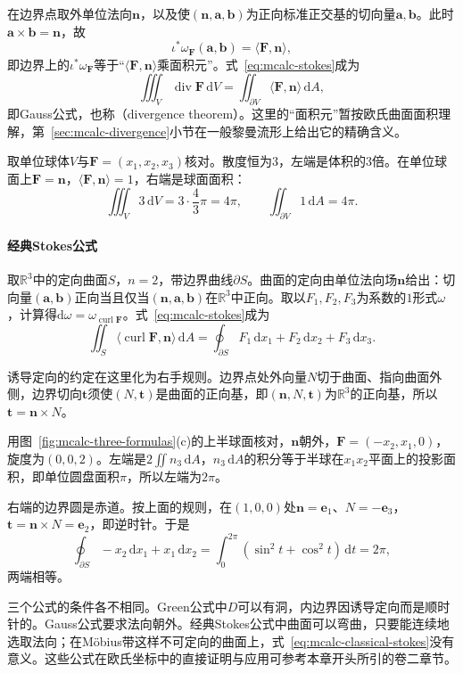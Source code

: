 在边界点取外单位法向$\bm n$，以及使$(\bm n,\bm a,\bm b)$为正向标准正交基的切向量$\bm a,\bm b$。此时$\bm a\times\bm b=\bm n$，故
\[
\iota^*\omega_{\bm F}(\bm a,\bm b)=\langle\bm F,\bm n\rangle ,
\]
即边界上的$\iota^*\omega_{\bm F}$等于“$\langle\bm F,\bm n\rangle$乘面积元”。式~\eqref{eq:mcalc-stokes}成为
\begin{equation}
\iiint_V\operatorname{div}\bm F\,\mathrm dV=\iint_{\partial V}\langle\bm F,\bm n\rangle\,\mathrm dA ,
\label{eq:mcalc-gauss}
\end{equation}
即Gauss公式，也称（divergence theorem）。这里的“面积元”暂按欧氏曲面面积理解，第~\ref{sec:mcalc-divergence}小节在一般黎曼流形上给出它的精确含义。

取单位球体$V$与$\bm F=(x_1,x_2,x_3)$核对。散度恒为$3$，左端是体积的$3$倍。在单位球面上$\bm F=\bm n$，$\langle\bm F,\bm n\rangle=1$，右端是球面面积：
\[
\iiint_V3\,\mathrm dV=3\cdot\frac43\pi=4\pi,\qquad
\iint_{\partial V}1\,\mathrm dA=4\pi .
\]

\paragraph{经典Stokes公式}
取$\mathbb R^3$中的定向曲面$S$，$n=2$，带边界曲线$\partial S$。曲面的定向由单位法向场$\bm n$给出：切向量$(\bm a,\bm b)$正向当且仅当$(\bm n,\bm a,\bm b)$在$\mathbb R^3$中正向。取以$F_1,F_2,F_3$为系数的$1$形式$\omega$，计算得$\mathrm d\omega=\omega_{\operatorname{curl}\bm F}$。式~\eqref{eq:mcalc-stokes}成为
\begin{equation}
\iint_S\langle\operatorname{curl}\bm F,\bm n\rangle\,\mathrm dA=\oint_{\partial S}F_1\,\mathrm dx_1+F_2\,\mathrm dx_2+F_3\,\mathrm dx_3 .
\label{eq:mcalc-classical-stokes}
\end{equation}

诱导定向的约定在这里化为右手规则。边界点处外向量$N$切于曲面、指向曲面外侧，边界切向$\bm t$须使$(N,\bm t)$是曲面的正向基，即$(\bm n,N,\bm t)$为$\mathbb R^3$的正向基，所以$\bm t=\bm n\times N$。

用图~\ref{fig:mcalc-three-formulas}(c)的上半球面核对，$\bm n$朝外，$\bm F=(-x_2,x_1,0)$，旋度为$(0,0,2)$。左端是$2\iint n_3\,\mathrm dA$，$n_3\,\mathrm dA$的积分等于半球在$x_1x_2$平面上的投影面积，即单位圆盘面积$\pi$，所以左端为$2\pi$。

右端的边界圆是赤道。按上面的规则，在$(1,0,0)$处$\bm n=\bm e_1$、$N=-\bm e_3$，$\bm t=\bm n\times N=\bm e_2$，即逆时针。于是
\[
\oint_{\partial S}-x_2\,\mathrm dx_1+x_1\,\mathrm dx_2=\int_0^{2\pi}(\sin^2t+\cos^2t)\,\mathrm dt=2\pi ,
\]
两端相等。

三个公式的条件各不相同。Green公式中$D$可以有洞，内边界因诱导定向而是顺时针的。Gauss公式要求法向朝外。经典Stokes公式中曲面可以弯曲，只要能连续地选取法向；在M\"obius带这样不可定向的曲面上，式~\eqref{eq:mcalc-classical-stokes}没有意义。这些公式在欧氏坐标中的直接证明与应用可参考本章开头所引的卷二章节。

